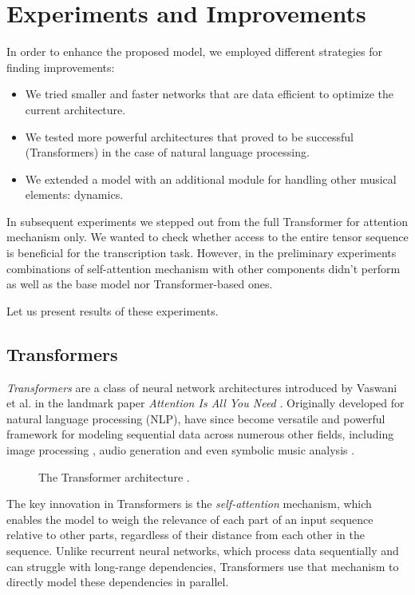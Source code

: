 \chapter{Experiments and Improvements}\label{experiments_and_improvements}

In order to enhance the proposed model, we employed different strategies for finding improvements: \begin{itemize}
	\item We tried smaller and faster networks that are data efficient to optimize the current architecture.
	\item We tested more powerful architectures that proved to be successful (Transformers) in the case of natural language processing.
	\item We extended a model with an additional module for handling other musical elements: dynamics.\end{itemize}
	
In subsequent experiments we stepped out from the full Transformer for attention mechanism only. We wanted to check whether access to the entire tensor sequence is beneficial for the transcription task. However, in the preliminary experiments combinations of self-attention mechanism with other components didn't perform as well as the base model nor Transformer-based ones.
	
Let us present results of these experiments.

\section{Transformers}

\emph{Transformers} are a class of neural network architectures introduced by Vaswani et al. in the landmark paper \emph{Attention Is All You Need} \cite{Vaswani2017}. Originally developed for natural language processing (NLP), have since become versatile and powerful framework for modeling sequential data across numerous other fields, including image processing \cite{Dosovitskiy2020}, audio generation \cite{Borsos2023} and even symbolic music analysis \cite{Zhu2021}.

\begin{figure}[ht!]
\centering

\caption[The Transformer architecture.]{The Transformer architecture \cite{Vaswani2017}.}
\end{figure}

The key innovation in Transformers is the \emph{self-attention} mechanism, which enables the model to weigh the relevance of each part of an input sequence relative to other parts, regardless of their distance from each other in the sequence. Unlike recurrent neural networks, which process data sequentially and can struggle with long-range dependencies, Transformers use that mechanism to directly model these dependencies in parallel.

